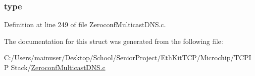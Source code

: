 \subsubsection[{type}]{ type}\label{struct__m_d_n_s_process_ctx__common_ad25f99368b3000728a36c5c1a0df39af}


Definition at line 249 of file Zeroconf\+Multicast\+D\+N\+S.\+c.



The documentation for this struct was generated from the following file\+:\begin{DoxyCompactItemize}
\item 
C\+:/\+Users/mainuser/\+Desktop/\+School/\+Senior\+Project/\+Eth\+Kit\+T\+C\+P/\+Microchip/\+T\+C\+P\+I\+P Stack/\hyperlink{_zeroconf_multicast_d_n_s_8c}{Zeroconf\+Multicast\+D\+N\+S.\+c}\end{DoxyCompactItemize}
